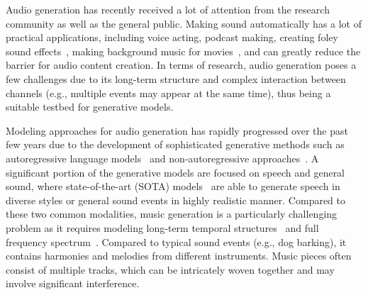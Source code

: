 Audio generation has recently received a lot of attention from the research community as well as the general public. Making sound automatically has a lot of practical applications, including voice acting, podcast making, creating foley sound effects~\cite{Luo2023DiffFoleySV}, making background music for movies~\cite{liu2023wavjourney}, and can greatly reduce the barrier for audio content creation.  In terms of research, audio generation poses a few challenges due to its long-term structure and complex interaction between channels (e.g., multiple events may appear at the same time), thus being a suitable testbed for generative models.

Modeling approaches for audio generation has rapidly progressed over the past few years due to the development of sophisticated generative methods such as autoregressive language models~\cite{Kreuk2022AudioGenTG,Wang2023NeuralCL} and non-autoregressive approaches~\cite{Le2023VoiceboxTM,Vyas2023AudioboxUA,liu2023audioldm}.
A significant portion of the generative models are focused on speech and general sound, where state-of-the-art (SOTA) models~\cite{Vyas2023AudioboxUA} are able to generate speech in diverse styles or general sound events in highly realistic manner. Compared to these two common modalities, music generation is a particularly challenging problem as it requires modeling long-term temporal structures~\cite{musiclm} and full frequency spectrum~\cite{muller2015fundamentals}. Compared to typical sound events (e.g., dog barking), it contains harmonies and melodies from different instruments. Music pieces often consist of multiple tracks, which can be intricately woven together and may involve significant interference.


